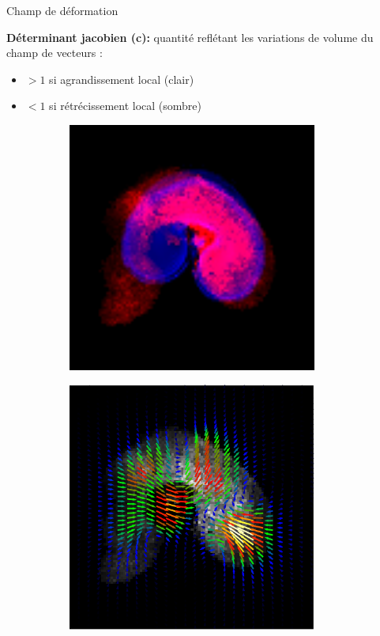 \documentclass[10pt]{beamer}
\begin{document}
\begin{frame}{Champ de déformation}

  \textbf{Déterminant jacobien (c):} quantité reflétant les variations de volume du champ de vecteurs :
  \begin{itemize}
  \item $>1$ si agrandissement local (clair)
  \item $<1$ si rétrécissement local (sombre)
  \end{itemize}

  
  \begin{figure}[ht]
    \centering
    \begin{subfigure}[t]{0.33\textwidth}
      \centering
      \includegraphics[width=0.9\textwidth]{fig/slice_overlay_affine}
      \caption{}
      \label{subfig:slice_overlay_affine}
    \end{subfigure}%
    \begin{subfigure}[t]{0.33\textwidth}
      \centering
      \includegraphics[width=0.9\textwidth]{fig/field_variational}

\end{subfigure}
\end{figure}
\end{frame}
\end{document}
